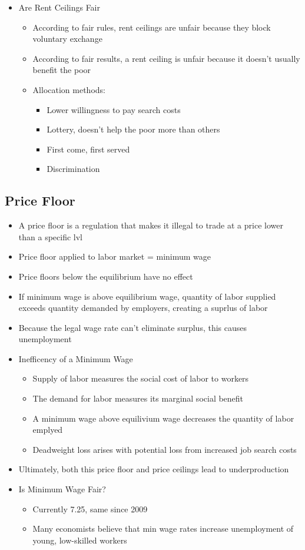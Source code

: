 \documentclass[11pt]{article}
\begin{document}
\begin{itemize}
\item Are Rent Ceilings Fair
\begin{itemize}
\item According to fair rules, rent ceilings are unfair because they block voluntary exchange
\item According to fair results, a rent ceiling is unfair because it doesn't usually benefit the poor
\item Allocation methods:
\begin{itemize}
\item Lower willingness to pay search costs
\item Lottery, doesn't help the poor more than others
\item First come, first served
\item Discrimination
\end{itemize}
\end{itemize}
\end{itemize}
\subsection{Price Floor}
\label{sec:org91fb66f}
\begin{itemize}
\item A price floor is a regulation that makes it illegal to trade at a price lower than a specific lvl
\item Price floor applied to labor market = minimum wage
\item Price floors below the equilibrium have no effect
\item If minimum wage is above equilibrium wage, quantity of labor supplied exceeds quantity demanded
by employers, creating a suprlus of labor
\item Because the legal wage rate can't eliminate surplus, this causes unemployment
\item Inefficency of a Minimum Wage
\begin{itemize}
\item Supply of labor measures the social cost of labor to workers
\item The demand for labor measures its marginal social benefit
\item A minimum wage above equilivium wage decreases the quantity of labor emplyed
\item Deadweight loss arises with potential loss from increased job search costs
\end{itemize}
\item Ultimately, both this price floor and price ceilings lead to underproduction
\item Is Minimum Wage Fair?
\begin{itemize}
\item Currently 7.25, same since 2009
\item Many economists believe that min wage rates increase unemployment of young, low-skilled workers
\end{itemize}
\end{itemize}
\end{document}
